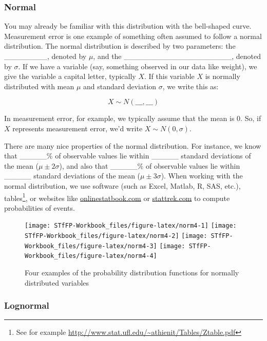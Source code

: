 \documentclass[]{book}
\let\rmarkdownfootnote\footnote%
\def\footnote{\protect\rmarkdownfootnote}
\theoremstyle{definition}
\theoremstyle{definition}
\theoremstyle{remark}
\begin{document}
\subsubsection{Normal}\label{normal}

You may already be familiar with this distribution with the bell-shaped
curve. Measurement error is one example of something often assumed to
follow a normal distribution. The normal distribution is described by
two parameters: the \_\_\_\_\_\_\_\_, denoted by \(\mu\), and the
\_\_\_\_\_\_\_\_\_\_\_\_\_\_\_\_\_\_\_\_, denoted by \(\sigma\). If we
have a variable (say, something observed in our data like weight), we
give the variable a capital letter, typically \(X\). If this variable
\(X\) is normally distributed with mean \(\mu\) and standard deviation
\(\sigma\), we write this as:

\[ X \sim N(\_\_\_, \_\_\_) \]

In measurement error, for example, we typically assume that the mean is
0. So, if \(X\) represents measurement error, we'd write
\(X \sim N(0,\sigma)\).

There are many nice properties of the normal distribution. For instance,
we know that \_\_\_\_\_\% of observable values lie within \_\_\_\_\_
standard deviations of the mean (\(\mu \pm 2\sigma\)), and also that
\_\_\_\_\_\% of observable values lie within \_\_\_\_\_ standard
deviations of the mean (\(\mu \pm 3\sigma\)). When working with the
normal distribution, we use software (such as Excel, Matlab, R, SAS,
etc.), tables\footnote{See for example
  \url{http://www.stat.ufl.edu/~athienit/Tables/Ztable.pdf}}, or
websites like
\href{http://onlinestatbook.com/2/calculators/normal_dist.html}{onlinestatbook.com}
or
\href{http://stattrek.com/online-calculator/normal.aspx}{stattrek.com}
to compute probabilities of events.

\begin{figure}[h]

{\centering \texttt{[image: STfFP-Workbook\_files/figure-latex/norm4-1]} \texttt{[image: STfFP-Workbook\_files/figure-latex/norm4-2]} \texttt{[image: STfFP-Workbook\_files/figure-latex/norm4-3]} \texttt{[image: STfFP-Workbook\_files/figure-latex/norm4-4]} 

}

\caption{Four examples of the probability distribution functions for normally distributed variables}\label{fig:norm4}
\end{figure}

\subsubsection{Lognormal}\label{lognormal}
\end{document}
